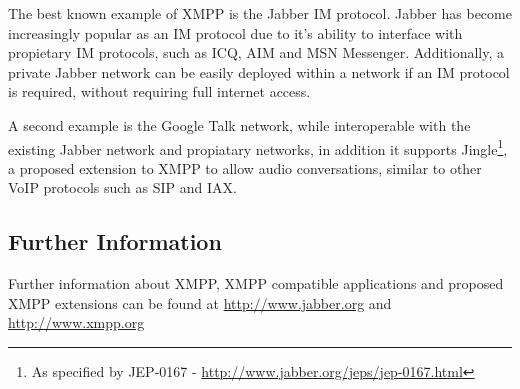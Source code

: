 The best known example of XMPP is the Jabber IM protocol. Jabber has
become increasingly popular as an IM protocol due to it's ability to
interface with propietary IM protocols, such as ICQ, AIM and MSN
Messenger. Additionally, a private Jabber network can be easily 
deployed within a network if an IM protocol is required, without 
requiring full internet access. 


A second example is the Google Talk network, while interoperable with
the existing Jabber network and propiatary networks, in addition it
supports Jingle\footnote{As specified by JEP-0167 - \url{http://www.jabber.org/jeps/jep-0167.html}},
a proposed extension to XMPP to allow audio conversations, similar to
other VoIP protocols such as SIP and IAX.

\subsection{Further Information}

Further information about XMPP, XMPP compatible applications and
proposed XMPP extensions can be found at \url{http://www.jabber.org} and
\url{http://www.xmpp.org}
